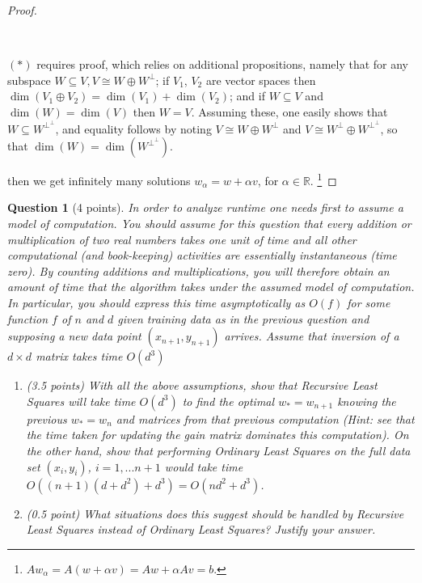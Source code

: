 \documentclass[12pt]{article}
\newcommand{\real}{\mathbb{R}}
\newtheorem{question}{Question}
\begin{document}
\begin{proof}
{\begin{indent}
  \end{indent}
  \\
  \begin{indent}
    $(*)$ requires proof, which relies on additional propositions, namely that for any subspace $W \subseteq V, V \cong W \oplus W^{\perp}$; if $V_1$, $V_2$ are vector spaces then $\dim(V_1 \oplus V_2)= \dim(V_1) + \dim(V_2)$; and if $W \subseteq V$ and $\dim(W) = \dim(V)$ then $W=V$. Assuming these, one easily shows that $W \subseteq W^{{\perp}^{\perp}}$, and equality follows by noting $V \cong W \oplus W^{\perp}$ and $V \cong W^{\perp} \oplus W^{{\perp}^{\perp}}$, so that $\dim(W) = \dim(W^{{\perp}^{\perp}})$.
  \end{indent}
  }
  then we get infinitely many solutions $w_{\alpha} = w + \alpha v$, for $\alpha \in \real$.
  \footnote{
  $Aw_{\alpha} = A(w + \alpha v) = Aw + \alpha Av = b$.
  }
\end{proof}
\newpage
\begin{question}[4 points]
  In order to analyze runtime one needs first to assume a model of computation.  You should assume for this question that every addition or multiplication of two real numbers takes one unit of time and all other computational (and book-keeping) activities are essentially instantaneous (time  zero). By  counting  additions and multiplications, you  will therefore obtain an amount of time that the algorithm takes under the assumed model of computation. In particular, you should express this time asymptotically as $O(f)$ for some function $f$ of $n$ and $d$ given training data as in the previous question and supposing a new data point $(x_{n+1}, y_{n+1})$ arrives.  Assume that inversion of a $d \times d$ matrix takes time $O(d^3)$
  \begin{enumerate}
  \item (3.5 points) With all the above assumptions, show that Recursive Least Squares will take time $O(d^3)$ to find the optimal $w_{*} = w_{n+1}$ knowing the previous $w_{*}=w_n$ and matrices from that previous computation (Hint:  see that the time taken for updating the gain matrix dominates this computation). On the other hand, show that performing Ordinary Least Squares on the full data set $(x_i, y_i)$, $ i= 1, . . . n+ 1$ would take time $O((n+ 1)(d+d^2) +d^3) =O(nd^2+d^3)$.
  \item
    (0.5 point) What situations does this suggest should be handled by Recursive Least Squares instead of Ordinary Least Squares?  Justify your answer.
  \end{enumerate}
\end{question}
\end{document}
